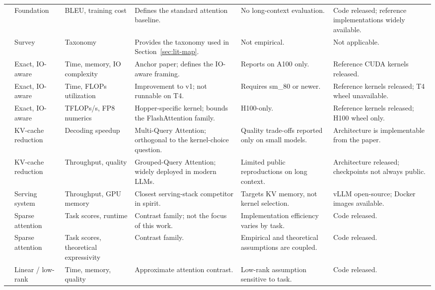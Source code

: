 \documentclass[11pt]{article}
\begin{document}
\begin{small}
\begin{longtable}{p{2.4cm} p{1.6cm} p{1.6cm} p{2.5cm} p{2.2cm} p{2.5cm}}
\cite{vaswani2023attentionneed} & Foundation & BLEU, training cost & Defines the standard attention baseline. & No long-context evaluation. & Code released; reference implementations widely available. \\
\cite{10.1145/3530811} & Survey & Taxonomy & Provides the taxonomy used in Section~\ref{sec:lit-map}. & Not empirical. & Not applicable. \\
\cite{dao2022flashattentionfastmemoryefficientexact} & Exact, IO-aware & Time, memory, IO complexity & Anchor paper; defines the IO-aware framing. & Reports on A100 only. & Reference CUDA kernels released. \\
\cite{dao2023flashattention2fasterattentionbetter} & Exact, IO-aware & Time, FLOPs utilization & Improvement to v1; not runnable on T4. & Requires sm\_80 or newer. & Reference kernels released; T4 wheel unavailable. \\
\cite{shah2024flashattention3fastaccurateattention} & Exact, IO-aware & TFLOPs/s, FP8 numerics & Hopper-specific kernel; bounds the FlashAttention family. & H100-only. & Reference kernels released; H100 wheel only. \\
\cite{shazeer2019fasttransformerdecodingwritehead} & KV-cache reduction & Decoding speedup & Multi-Query Attention; orthogonal to the kernel-choice question. & Quality trade-offs reported only on small models. & Architecture is implementable from the paper. \\
\cite{ainslie2023gqatraininggeneralizedmultiquery} & KV-cache reduction & Throughput, quality & Grouped-Query Attention; widely deployed in modern LLMs. & Limited public reproductions on long context. & Architecture released; checkpoints not always public. \\
\cite{kwon2023efficientmemorymanagementlarge} & Serving system & Throughput, GPU memory & Closest serving-stack competitor in spirit. & Targets KV memory, not kernel selection. & vLLM open-source; Docker images available. \\
\cite{beltagy2020longformerlongdocumenttransformer} & Sparse attention & Task scores, runtime & Contrast family; not the focus of this work. & Implementation efficiency varies by task. & Code released. \\
\cite{zaheer2021bigbirdtransformerslonger} & Sparse attention & Task scores, theoretical expressivity & Contrast family. & Empirical and theoretical assumptions are coupled. & Code released. \\
\cite{wang2020linformerselfattentionlinearcomplexity} & Linear / low-rank & Time, memory, quality & Approximate attention contrast. & Low-rank assumption sensitive to task. & Code released. \\

\end{longtable}
\end{small}
\end{document}
